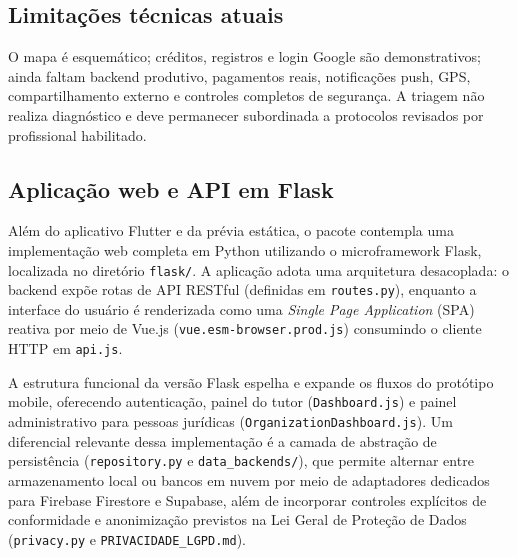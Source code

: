 \documentclass[12pt,a4paper]{article}
\begin{document}
\subsection{Limitações técnicas atuais}
O mapa é esquemático; créditos, registros e login Google são demonstrativos; ainda faltam backend produtivo, pagamentos reais, notificações push, GPS, compartilhamento externo e controles completos de segurança. A triagem não realiza diagnóstico e deve permanecer subordinada a protocolos revisados por profissional habilitado.

\subsection{Aplicação web e API em Flask}
Além do aplicativo Flutter e da prévia estática, o pacote contempla uma implementação web completa em Python utilizando o microframework Flask, localizada no diretório \texttt{flask/}. A aplicação adota uma arquitetura desacoplada: o backend expõe rotas de API RESTful (definidas em \texttt{routes.py}), enquanto a interface do usuário é renderizada como uma \textit{Single Page Application} (SPA) reativa por meio de Vue.js (\texttt{vue.esm-browser.prod.js}) consumindo o cliente HTTP em \texttt{api.js}.

A estrutura funcional da versão Flask espelha e expande os fluxos do protótipo mobile, oferecendo autenticação, painel do tutor (\texttt{Dashboard.js}) e painel administrativo para pessoas jurídicas (\texttt{OrganizationDashboard.js}). Um diferencial relevante dessa implementação é a camada de abstração de persistência (\texttt{repository.py} e \texttt{data\_backends/}), que permite alternar entre armazenamento local ou bancos em nuvem por meio de adaptadores dedicados para Firebase Firestore e Supabase, além de incorporar controles explícitos de conformidade e anonimização previstos na Lei Geral de Proteção de Dados (\texttt{privacy.py} e \texttt{PRIVACIDADE\_LGPD.md}).
\end{document}
